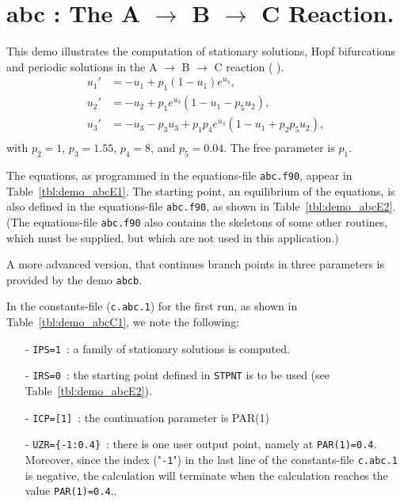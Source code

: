 \documentclass[12pt]{report}
\begin{document}
\newpage
\section{ abc : The A $\to$ B $\to$ C Reaction.} \label{sec:Demos_abc}
This demo illustrates the computation of 
stationary solutions,
Hopf bifurcations 
and
periodic solutions
in the A $\to$ B $\to$ C reaction 
( \citeyear{DoHe:83}).
\begin{equation} \begin{array}{cl}
  u_1 ' &=  -u_1 + p_1 (1-u_1) e^{u_3}, \\
  u_2 ' &=  -u_2 +  p_1 e^{u_3} ( 1-u_1 - p_5 u_2 ),\\
  u_3 ' &=  -u_3 - p_3 u_3 + p_1 p_4 e^{u_3}  
  ( 1-u_1 + p_2 p_5 u_2 ),\\ \end{array} \end{equation}
with $p_2=1$, $p_3=1.55$, $p_4=8$, and $p_5=0.04$. 
The free parameter is $p_1$.

The equations, as programmed in the equations-file {\tt abc.f90},
appear in Table~\ref{tbl:demo_abcE1}.
The starting point, an equilibrium of the equations,
is also defined in  the equations-file {\tt abc.f90},
as shown in  Table~\ref{tbl:demo_abcE2}.
(The equations-file {\tt abc.f90} also contains the skeletons
of some other routines, which must be supplied, but which 
are not used in this application.)

A more advanced version, that continues branch points in three
parameters is provided by the demo {\tt abcb}.

In the constants-file ({\tt c.abc.1}) for the first run, as shown in 
Table~\ref{tbl:demo_abcC1}, we note the following:

\begin{itemize}
\item[-] {\tt IPS=1}~: a family of stationary solutions is computed.

\item[-] {\tt IRS=0}~: the starting point defined in {\tt STPNT} 
	 is to be used (see  Table~\ref{tbl:demo_abcE2}). 

\item[-] {\tt ICP=[1]}~: the continuation parameter is PAR(1) 

\item[-] {\tt UZR=\{-1:0.4\}}~: there is one user output point, namely at
	 {\tt PAR(1)=0.4}. Moreover, since the index ("{\tt -1}") in
	 the last line of the constants-file {\tt c.abc.1} is negative, 
	 the calculation will terminate when the calculation reaches
	 the value {\tt PAR(1)=0.4}..
\end{itemize}
\end{document}
